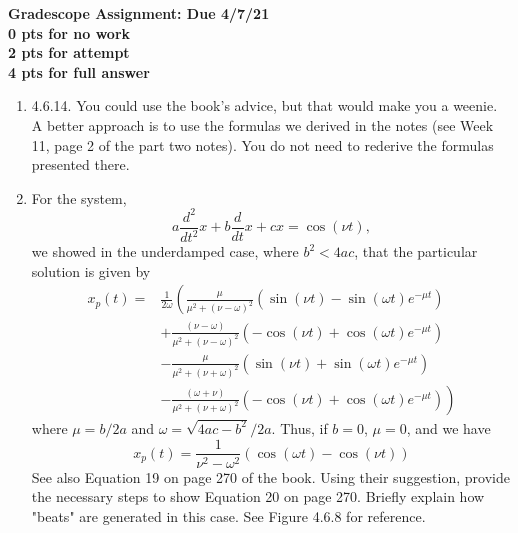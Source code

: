 \documentclass[a4paper,11pt]{article}
\begin{document}
\begin{center}
{\bf Gradescope Assignment: Due 4/7/21\\
0 pts for no work\\ 2 pts for attempt\\ 4 pts for full answer}
\end{center}

\begin{enumerate}
\item 4.6.14.  You could use the book's advice, but that would make you a weenie.  A better approach is to use the formulas we derived in the notes (see Week 11, page 2 of the part two notes).  You do not need to rederive the formulas presented there.  

\item For the system,
\[
a\frac{d^{2}}{dt^{2}}x + b \frac{d}{dt}x + c x = \cos(\nu t),
\]
we showed in the underdamped case, where $b^{2}<4ac$, that the particular solution is given by 
\begin{align*}
x_{p}(t) = & \frac{1}{2\omega}\left(\frac{\mu}{\mu^{2}+(\nu-\omega)^{2}}\left(\sin(\nu t) - \sin(\omega t)e^{-\mu t}\right) \right. \\
& + \frac{(\nu-\omega)}{\mu^{2}+(\nu-\omega)^{2}}\left(-\cos(\nu t) + \cos(\omega t)e^{-\mu t}\right) \\
& - \frac{\mu}{\mu^{2}+(\nu+\omega)^{2}}\left(\sin(\nu t) + \sin(\omega t)e^{-\mu t}\right) \\
& \left. - \frac{(\omega+\nu)}{\mu^{2}+(\nu+\omega)^{2}}\left(-\cos(\nu t) + \cos(\omega t)e^{-\mu t}\right) \right)
\end{align*}
where $\mu=b/2a$ and $\omega = \sqrt{4ac-b^{2}}/2a$.  Thus, if $b=0$, $\mu=0$, and we have 
\[
x_{p}(t) = \frac{1}{\nu^{2}-\omega^{2}}\left(\cos(\omega t)-\cos(\nu t)\right) 
\]
See also Equation 19 on page 270 of the book.  Using their suggestion, provide the necessary steps to show Equation 20 on page 270.  Briefly explain how "beats" are generated in this case.  See Figure 4.6.8 for reference.  
\end{enumerate}
\end{document}
